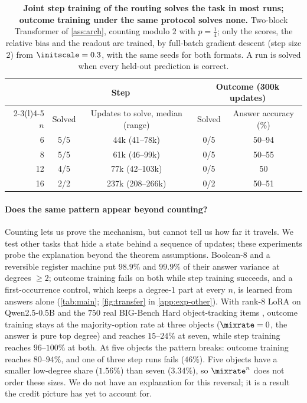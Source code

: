 \begin{table}[t]
\caption{\textbf{Joint step training of the routing solves the task in most runs; outcome training under the same protocol solves
none.} Two-block Transformer of \cref{ass:arch}, counting modulo $2$ with $p=\tfrac{1}{4}$; only the scores, the relative bias and the
readout are trained, by full-batch gradient descent (step size $2$) from $\initscale=0.3$, with the same seeds for both formats. A run is
solved when every held-out prediction is correct.}
\label{tab:reach}
\centering\small
\begin{tabular}{@{}rcccc@{}}
\toprule
 & \multicolumn{2}{c}{Step} & \multicolumn{2}{c}{Outcome (300k updates)}\\
\cmidrule(lr){2-3}\cmidrule(l){4-5}
$n$ & Solved & Updates to solve, median (range) & Solved & Answer accuracy (\%)\\
\midrule
6  & 5/5 & 44k (41--78k)   & 0/5 & 50--94\\
8  & 5/5 & 61k (46--99k)   & 0/5 & 50--55\\
12 & 4/5 & 77k (42--103k)  & 0/5 & 50\\
16 & 2/2 & 237k (208--266k) & 0/2 & 50--51\\
\bottomrule
\end{tabular}
\end{table}

\paragraph{Does the same pattern appear beyond counting?} Counting lets us prove the mechanism, but cannot tell us how far it travels.
We test other tasks that hide a state behind a sequence of updates; these experiments probe the explanation beyond the theorem assumptions.
Boolean-8 and a reversible register machine put $98.9\%$ and $99.9\%$ of their answer variance at degrees $\ge2$; outcome
training fails on both while step training succeeds, and a first-occurrence control, which keeps a degree-$1$ part at
every $n$, is learned from answers alone (\cref{tab:main}; \cref{fig:transfer} in \cref{app:exp-other}). With rank-8 LoRA on Qwen2.5-0.5B and the
$750$ real BIG-Bench Hard object-tracking items \citep{suzgun2022challenging}, outcome training stays at the
majority-option rate at three objects ($\mixrate=0$, the answer is pure top degree) and reaches $15$--$24\%$ at seven, while
step training reaches $96$--$100\%$ at both. At five objects the pattern breaks: outcome training reaches $80$--$94\%$, and one
of three step runs fails ($46\%$). Five objects have a smaller low-degree share ($1.56\%$) than seven ($3.34\%$), so $\mixrate^n$
does not order these sizes. We do not have an explanation for this reversal; it is a result the credit picture has yet to account for.


